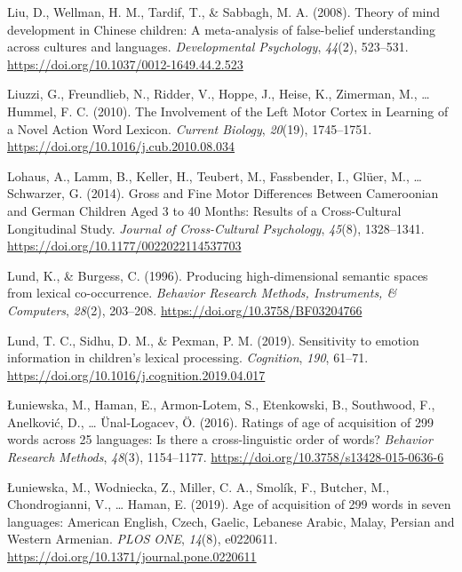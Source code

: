 \documentclass[
  man,floatsintext]{apa6}
\newlength{\cslhangindent}
\newenvironment{CSLReferences}[2] %
 {\begin{list}{}{%
  \setlength{\itemindent}{0pt}
  \setlength{\leftmargin}{0pt}
  \setlength{\parsep}{0pt}
  \ifodd #1
   \setlength{\leftmargin}{\cslhangindent}
   \setlength{\itemindent}{-1\cslhangindent}
  \fi
  \setlength{\itemsep}{#2\baselineskip}}}
 {\end{list}}
\begin{document}
\begin{CSLReferences}{1}{0}
Liu, D., Wellman, H. M., Tardif, T., \& Sabbagh, M. A. (2008). Theory of mind development in {Chinese} children: {A} meta-analysis of false-belief understanding across cultures and languages. \emph{Developmental Psychology}, \emph{44}(2), 523--531. \url{https://doi.org/10.1037/0012-1649.44.2.523}

Liuzzi, G., Freundlieb, N., Ridder, V., Hoppe, J., Heise, K., Zimerman, M., \ldots{} Hummel, F. C. (2010). The {Involvement} of the {Left Motor Cortex} in {Learning} of a {Novel Action Word Lexicon}. \emph{Current Biology}, \emph{20}(19), 1745--1751. \url{https://doi.org/10.1016/j.cub.2010.08.034}

Lohaus, A., Lamm, B., Keller, H., Teubert, M., Fassbender, I., Glüer, M., \ldots{} Schwarzer, G. (2014). Gross and {Fine Motor Differences Between Cameroonian} and {German Children Aged} 3 to 40 {Months}: {Results} of a {Cross-Cultural Longitudinal Study}. \emph{Journal of Cross-Cultural Psychology}, \emph{45}(8), 1328--1341. \url{https://doi.org/10.1177/0022022114537703}

Lund, K., \& Burgess, C. (1996). Producing high-dimensional semantic spaces from lexical co-occurrence. \emph{Behavior Research Methods, Instruments, \& Computers}, \emph{28}(2), 203--208. \url{https://doi.org/10.3758/BF03204766}

Lund, T. C., Sidhu, D. M., \& Pexman, P. M. (2019). Sensitivity to emotion information in children's lexical processing. \emph{Cognition}, \emph{190}, 61--71. \url{https://doi.org/10.1016/j.cognition.2019.04.017}

Łuniewska, M., Haman, E., Armon-Lotem, S., Etenkowski, B., Southwood, F., Anelković, D., \ldots{} Ünal-Logacev, Ö. (2016). Ratings of age of acquisition of 299 words across 25 languages: {Is} there a cross-linguistic order of words? \emph{Behavior Research Methods}, \emph{48}(3), 1154--1177. \url{https://doi.org/10.3758/s13428-015-0636-6}

Łuniewska, M., Wodniecka, Z., Miller, C. A., Smolík, F., Butcher, M., Chondrogianni, V., \ldots{} Haman, E. (2019). Age of acquisition of 299 words in seven languages: {American English}, {Czech}, {Gaelic}, {Lebanese Arabic}, {Malay}, {Persian} and {Western Armenian}. \emph{PLOS ONE}, \emph{14}(8), e0220611. \url{https://doi.org/10.1371/journal.pone.0220611}


\end{CSLReferences}
\end{document}
